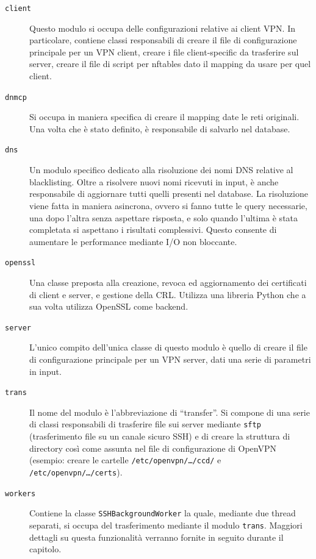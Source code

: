 \begin{description}
  \item[\texttt{client}]Questo modulo si occupa delle configurazioni relative ai
  client VPN. In particolare, contiene classi responsabili di creare il file
  di configurazione principale per un VPN client, creare i file client-specific
  da trasferire sul server, creare il file di script per nftables dato il mapping
  da usare per quel client.
  \item[\texttt{dnmcp}]Si occupa in maniera specifica di creare il mapping date
  le reti originali. Una volta che è stato definito, è responsabile di salvarlo
  nel database.
  \item[\texttt{dns}]Un modulo specifico dedicato alla risoluzione dei nomi
  DNS relative al blacklisting. Oltre a risolvere nuovi nomi ricevuti in input,
  è anche responsabile di aggiornare tutti quelli presenti nel database.
  La risoluzione viene fatta in maniera asincrona, ovvero si fanno tutte le query
  necessarie, una dopo l'altra senza aspettare risposta, e solo quando l'ultima
  è stata completata si aspettano i risultati complessivi. Questo consente
  di aumentare le performance mediante I/O non bloccante.
  \item[\texttt{openssl}]Una classe preposta alla creazione, revoca ed aggiornamento
  dei certificati di client e server, e gestione della CRL. Utilizza una
  libreria Python che a sua volta utilizza OpenSSL come backend.
  \item[\texttt{server}]L'unico compito dell'unica classe di questo modulo è quello
  di creare il file di configurazione principale per un VPN server, dati una serie
  di parametri in input.
  \item[\texttt{trans}]Il nome del modulo è l'abbreviazione di ``transfer''. Si
  compone di una serie di classi responsabili di trasferire file sui server mediante
  \texttt{sftp} (trasferimento file su un canale sicuro SSH) e di creare
  la struttura di directory così come assunta nel file di configurazione di OpenVPN
  (esempio: creare le cartelle \texttt{/etc/openvpn/\ldots/ccd/} e \texttt{/etc/openvpn/\ldots/certs}).
  \item[\texttt{workers}]Contiene la classe \texttt{SSHBackgroundWorker} la quale, mediante
  due thread separati, si occupa del trasferimento mediante il modulo \texttt{trans}.
  Maggiori dettagli su questa funzionalità verranno fornite in seguito durante
  il capitolo.
\end{description}

